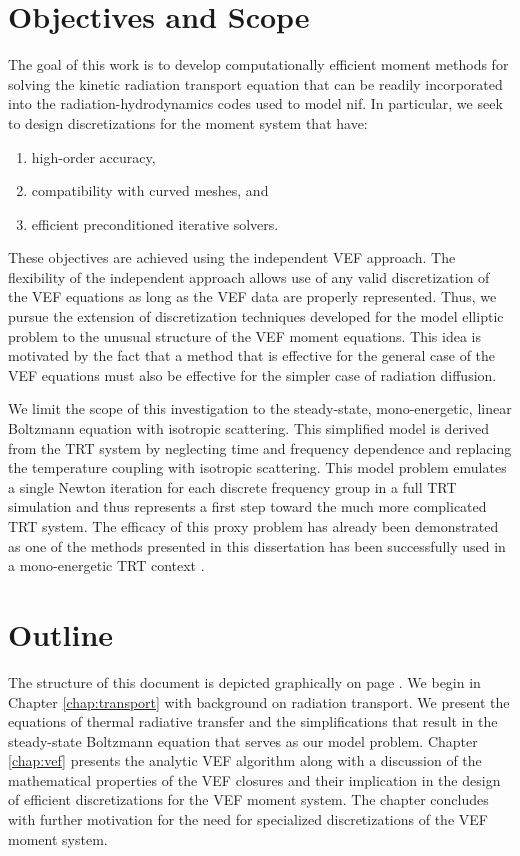 \documentclass[../doc.tex]{subfiles}
\begin{document}
\section{Objectives and Scope}
The goal of this work is to develop computationally efficient moment methods for solving the kinetic radiation transport equation that can be readily incorporated into the radiation-hydrodynamics codes used to model \gls{nif}. In particular, we seek to design discretizations for the moment system that have: 
	\begin{enumerate}
		\item high-order accuracy, 
		\item compatibility with curved meshes, and
		\item efficient preconditioned iterative solvers. 
	\end{enumerate}
These objectives are achieved using the independent VEF approach. The flexibility of the independent approach allows use of any valid discretization of the VEF equations as long as the VEF data are properly represented. Thus, we pursue the extension of discretization techniques developed for the model elliptic problem to the unusual structure of the VEF moment equations. This idea is motivated by the fact that a method that is effective for the general case of the VEF equations must also be effective for the simpler case of radiation diffusion.

We limit the scope of this investigation to the steady-state, mono-energetic, linear Boltzmann equation with isotropic scattering. This simplified model is derived from the TRT system by neglecting time and frequency dependence and replacing the temperature coupling with isotropic scattering. This model problem emulates a single Newton iteration for each discrete frequency group in a full TRT simulation and thus represents a first step toward the much more complicated TRT system. The efficacy of this proxy problem has already been demonstrated as one of the methods presented in this dissertation has been successfully used in a mono-energetic TRT context \cite{yee_mc21}. 

\section{Outline}
The structure of this document is depicted graphically on page \pageref{preamble:interdependence}. 
We begin in Chapter \ref{chap:transport} with background on radiation transport. We present the equations of thermal radiative transfer and the simplifications that result in the steady-state Boltzmann equation that serves as our model problem. Chapter \ref{chap:vef} presents the analytic VEF algorithm along with a discussion of the mathematical properties of the VEF closures and their implication in the design of efficient discretizations for the VEF moment system. The chapter concludes with further motivation for the need for specialized discretizations of the VEF moment system. 
\end{document}
